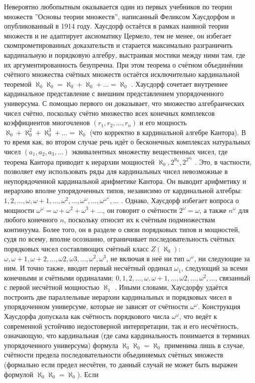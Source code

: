 \documentclass[12pt]{article}
\begin{document}
Невероятно любопытным оказывается один из первых учебников по теории множеств ''Основы теории множеств'', написанный Феликсом Хаусдорфом и опубликованный в 1914 году. Хаусдорф остаётся в рамках наивной теории множеств и не адаптирует аксиоматику Цермело, тем не менее, он избегает скомпрометированных доказательств и старается максимально разграничить кардинальную и порядковую алгебру, выстраивая мостики между ними там, где их аргументированность безупречна. При этом теорема о счётном объединёнии счётного множества счётных множеств остаётся исключительно кардинальной теоремой $\aleph_0\aleph_0 = \aleph_0 + \aleph_0 + \dots = \aleph_0$ \cite{hausdorff-cardinal-arithmetic}. Хаусдорф сочетает внутреннее кардинальное представление с внешним представлением упорядоченного универсума. С помощью первого он доказывает, что множество алгебраических чисел счётно, поскольку счётно множество всех конечных комплексов коэффициентов многочленов $(r_1, r_2, \dots, r_n)$ и его мощность $\aleph_0 + \aleph_0^2 + \aleph_0^3 + \dots = \aleph_0$ (что корректно в кардинальной алгебре Кантора). В то время как, во втором случае речь идёт о бесконечных комплексах натуральных чисел $(a_1, a_2, a_3, \dots)$ эквивалентных множеству вещественных чисел, где теорема Кантора приводит к иерархии мощностей $\aleph_0, 2^{\aleph_0}, 2^{2^{\aleph_0}}$ \cite{hausdorff-cardinal-hierarchy}. Это, в частности, позволяет ему использовать ряды для кардинальных чисел невозможные в неупорядоченной кардинальной арифметике Кантора. Он выводит арифметику и иерархию вполне упорядоченных типов, независимо от кардинальной алгебры: $1, 2, \dots, \omega, \omega + 1, \dots, \omega^2, \dots, \omega^{\omega}, \dots, \omega^{\omega^{\omega}}, \dots$ \cite{hausdorff-ordinal-arithmetic}. Однако, Хаусдорф избегает вопроса о мощности $\omega^{\omega} = \omega + \omega^2 + \omega^3 + \dots$, он говорит о счётности $2^{\omega} = \omega$, а также $n^{\omega}$ для любого конечного $n$, поскольку относит их к счётным подмножествам континуума. Более того, он в разделе о связи порядковых типов и мощностей, судя по всему, вполне осознанно, ограничивает последовательность счётных порядковых чисел составляющих счётный класс $Z(\aleph_0)$: $\omega, \omega + 1, \omega + 2, \dots, \omega2, \omega3, \dots, \omega^2, \omega^3$, не включая в неё ни тип $\omega^{\omega}$, ни следующие за ним. И точно также, вводит первый несчётный ординал $\omega_1$, следующий за всеми конечными и счётными ординалами: $0, 1, 2, \dots, \omega, \omega + 1, \dots, \omega2, \dots, \omega^2, \dots$, связанный с первой несчётной мощностью $\aleph_1$ \cite{hausdorff-cardinal-ordinal}. Иными словами, Хаусдорфу удаётся построить две параллельные иерархии кардинальных и порядковых чисел в упорядоченном универсуме, которые не зависят от счётности $\omega^{\omega}$. Конструкция Хаусдорфа допускала как счётность порядкового числа $\omega^{\omega}$, что ведёт к современной устойчиво недостоверной интерпретации, так и его несчётность, означающую, что кардинальная (где сама кардинальность понимается в терминах упорядоченного универсума) формула $\aleph_0\aleph_0 = \aleph_0$ применима лишь в случае, счётности предела последовательности объединяемых счётных множеств (формально если предел несчётен, то данный случай не может быть выражен формулой $\aleph_0\aleph_0 = \aleph_0$). Если 
\end{document}

